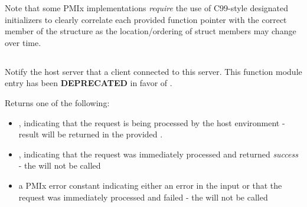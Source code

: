 \advicermstart
Note that some \ac{PMIx} implementations \emph{require} the use of C99-style
designated initializers to clearly correlate each provided function pointer with the correct member of the  structure as the location/ordering of struct members may change over time.
\advicermend

\subsection{}

\summary

Notify the host server that a client connected to this server. This function module entry has been \textbf{DEPRECATED} in favor of .

\format


\begin{arglist}
\end{arglist}

Returns one of the following:

\begin{itemize}
    \item {}, indicating that the request is being processed by the host environment - result will be returned in the provided .
    \item {}, indicating that the request was immediately processed and returned \textit{success} - the  will not be called
    \item a PMIx error constant indicating either an error in the input or that the request was immediately processed and failed - the  will not be called
\end{itemize}

